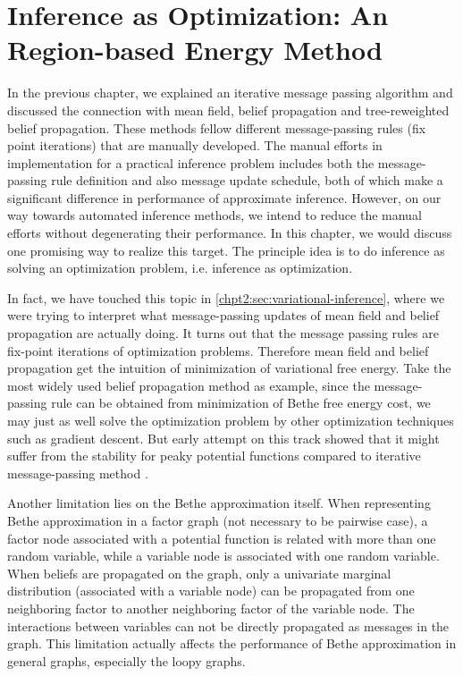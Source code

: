 \chapter{Inference as Optimization: An Region-based Energy Method}
\label{chapter4}
In the previous chapter, we explained an iterative message passing algorithm and discussed the connection with mean field, belief propagation and tree-reweighted belief propagation. These methods fellow different message-passing rules (fix point iterations) that are manually developed. The manual efforts in implementation for a practical inference problem includes both the message-passing rule definition and also message update schedule, both of which make a significant difference in performance of approximate inference. However, on our way towards automated inference methods, we intend to reduce the manual efforts without degenerating their performance. In this chapter, we would discuss one promising way to realize this target. The principle idea is to do inference as solving an optimization problem, i.e. inference as optimization.

In fact, we have touched this topic in \autoref{chpt2:sec:variational-inference}, where we were trying to interpret what message-passing updates of mean field and belief propagation are actually doing. It turns out that the message passing rules are fix-point iterations of optimization problems. Therefore mean field and belief propagation get the intuition of minimization of variational free energy. Take the most widely used belief propagation method as example, since the message-passing rule can be obtained from minimization of Bethe free energy cost, we may just as well solve the optimization problem by other optimization techniques such as gradient descent. But early attempt on this track showed that it might suffer from the stability for peaky potential functions compared to iterative message-passing method \cite{welling2001belief}.


Another limitation lies on the Bethe approximation itself. When representing Bethe approximation in a factor graph (not necessary to be pairwise case), a factor node associated with a potential function is related with more than one random variable, while a variable node is associated with one random variable. When beliefs are propagated on the graph, only a univariate marginal distribution (associated with a variable node) can be propagated from one neighboring factor to another neighboring factor of the variable node. The interactions between variables can not be directly propagated as messages in the graph. This limitation actually affects the performance of Bethe approximation in general graphs, especially the loopy graphs.

